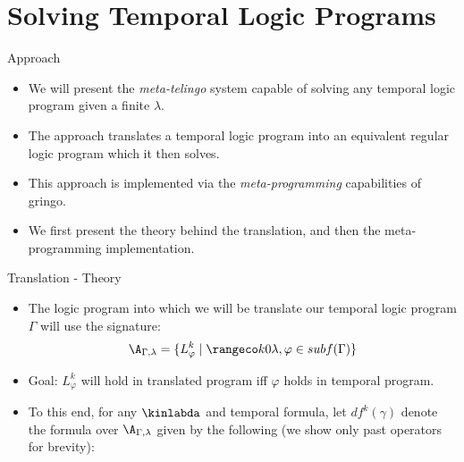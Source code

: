 \documentclass[aspectratio=169,xcolor=svgnames]{beamer}
\theoremstyle{theoremstyle_space}
\begin{document}
\section{Solving Temporal Logic Programs}

\begin{frame}{Approach}
  \begin{itemize}
  \item We will present the \textit{meta-telingo} system capable of
    solving any temporal logic program given a finite $\lambda$.
  \item The approach translates a temporal logic program into an equivalent
    regular logic program which it then solves.
  \item This approach is implemented via the \textit{meta-programming}
    capabilities of gringo.
  \item We first present the theory behind the translation, and then
    the meta-programming implementation.
  \end{itemize}

\end{frame}

\begin{frame}[t]{Translation - Theory}

  \begin{itemize}
  \item The logic program into which we will be translate our temporal
    logic program $\Gamma$ will use the signature:
  $$
  \A_{\Gamma,\lambda} = \{ L_{\varphi}^k \mid \kinlambda, \varphi \in subf(\Gamma) \}
  $$
\item Goal: $L_{\varphi}^k$ will hold in translated program iff
  $\varphi$ holds in temporal program.
\item To this end, for any $\kinlabda$ and temporal formula, let
  $df^k(\gamma)$ denote the formula over $\A_{\Gamma,\lambda}$ given
  by the following (we show only past operators for brevity):
  \end{itemize}
\end{frame}
\end{document}
